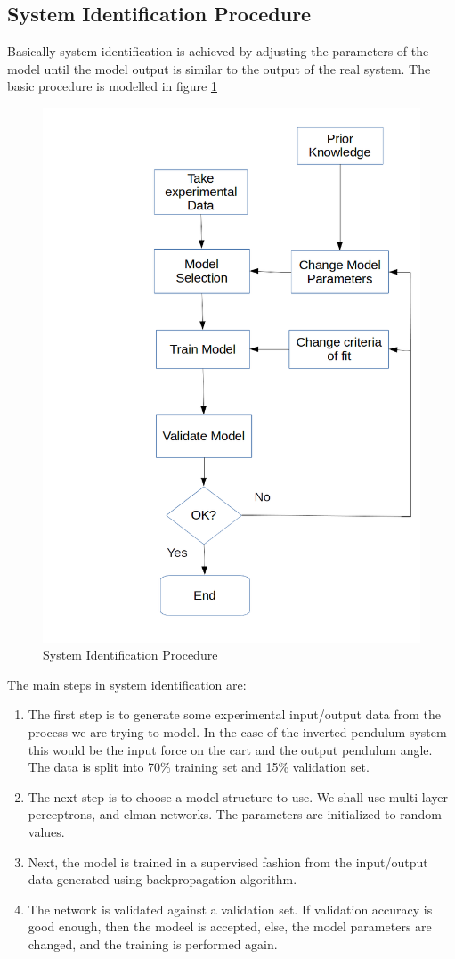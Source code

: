 \documentclass[12pt, onecolumn]{extarticle}
\begin{document}
\subsection{System Identification Procedure}
Basically system identification is achieved by adjusting the parameters of the model until the
model output is similar to the output of the real system. The basic procedure is modelled in figure \ref{fig:Sys_Identification_block}
\begin{figure}[h!]
\centering
\includegraphics[width=0.7\linewidth]{Sys_Identification_block}
\caption{System Identification Procedure}
\label{fig:Sys_Identification_block}
\end{figure}

The main steps in system identification are: \\ \begin{enumerate}
	\item The first step is to generate some experimental input/output data from the process we
	are trying to model. In the case of the inverted pendulum system this would be the
	input force on the cart and the output pendulum angle. The data is split into 70\% training set and 15\% validation set.  
	\item The next step is to choose a model structure to use. We shall use multi-layer perceptrons, and elman networks. The parameters are initialized to random values.
	\item Next, the model is trained in a supervised fashion from the input/output data generated using backpropagation algorithm.
	\item The network is validated against a validation set. If validation accuracy is good enough, then the modeel is accepted, else, the model parameters are changed, and the training is performed again.
\end{enumerate}
\end{document}
